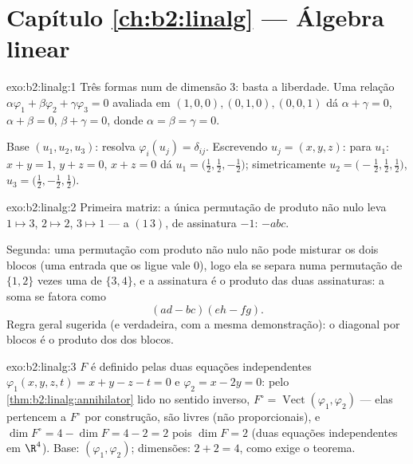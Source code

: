 \section*{Capítulo \ref{ch:b2:linalg} --- Álgebra linear}

\begin{solution}{exo:b2:linalg:1}
Três formas num  de dimensão $3$: basta a liberdade. Uma relação
$\alpha\varphi_1 + \beta\varphi_2 + \gamma\varphi_3 = 0$ avaliada em
$(1,0,0), (0,1,0), (0,0,1)$ dá $\alpha + \gamma = 0$, $\alpha +
\beta = 0$, $\beta + \gamma = 0$, donde $\alpha = \beta = \gamma =
0$.

Base  $(u_1, u_2, u_3)$: resolva $\varphi_i(u_j) =
\delta_{ij}$. Escrevendo $u_j = (x, y, z)$: para $u_1$: $x + y = 1$,
$y + z = 0$, $x + z = 0$ dá $u_1 = \bigl(\tfrac12, \tfrac12,
-\tfrac12\bigr)$; simetricamente $u_2 = \bigl(-\tfrac12, \tfrac12,
\tfrac12\bigr)$, $u_3 = \bigl(\tfrac12, -\tfrac12, \tfrac12\bigr)$.
\end{solution}

\begin{solution}{exo:b2:linalg:2}
Primeira matriz: a única permutação de produto não nulo leva $1 \mapsto
3$, $2 \mapsto 2$, $3 \mapsto 1$ --- a  $(1\,3)$,
de assinatura $-1$:  $-abc$.

Segunda: uma permutação com produto não nulo não pode misturar os dois
blocos (uma entrada que os ligue vale $0$), logo ela se separa numa permutação
de $\{1,2\}$ vezes uma de $\{3,4\}$, e a assinatura é o
produto das duas assinaturas: a soma se fatora como
\[
(ad - bc)(eh - fg) .
\]
Regra geral sugerida (e verdadeira, com a mesma demonstração): o  diagonal por blocos é o produto dos  dos
blocos.
\end{solution}

\begin{solution}{exo:b2:linalg:3}
$F$ é definido pelas duas equações independentes $\varphi_1(x,y,z,t)
= x + y - z - t = 0$ e $\varphi_2 = x - 2y = 0$: pelo
\cref{thm:b2:linalg:annihilator} lido no sentido inverso, $F^\circ =
\operatorname{Vect}(\varphi_1, \varphi_2)$ --- elas pertencem a $F^\circ$
por construção, são livres (não proporcionais), e $\dim F^\circ
= 4 - \dim F = 4 - 2 = 2$ pois $\dim F = 2$ (duas equações independentes
em $\R^4$). Base: $(\varphi_1, \varphi_2)$; dimensões:
$2 + 2 = 4$, como exige o teorema.
\end{solution}


